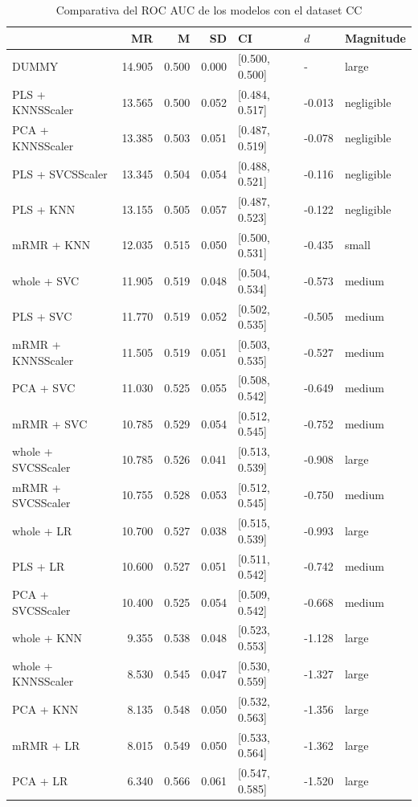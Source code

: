 \documentclass[a4paper,oneside,11pt,leqno]{article}
\begin{document}
	\begin{table}[h]
		\centering
		\begin{tabular}{lrrrlll}
			\toprule
			{} &     MR &     M &    SD &              CI &    $d$ &   Magnitude \\
			\midrule
			DUMMY              & 14.905 & 0.500 & 0.000 &  [0.500, 0.500] &      - &       large \\
			PLS + KNNSScaler   & 13.565 & 0.500 & 0.052 &  [0.484, 0.517] & -0.013 &  negligible \\
			PCA + KNNSScaler   & 13.385 & 0.503 & 0.051 &  [0.487, 0.519] & -0.078 &  negligible \\
			PLS + SVCSScaler   & 13.345 & 0.504 & 0.054 &  [0.488, 0.521] & -0.116 &  negligible \\
			PLS + KNN          & 13.155 & 0.505 & 0.057 &  [0.487, 0.523] & -0.122 &  negligible \\
			mRMR + KNN         & 12.035 & 0.515 & 0.050 &  [0.500, 0.531] & -0.435 &       small \\
			whole + SVC        & 11.905 & 0.519 & 0.048 &  [0.504, 0.534] & -0.573 &      medium \\
			PLS + SVC          & 11.770 & 0.519 & 0.052 &  [0.502, 0.535] & -0.505 &      medium \\
			mRMR + KNNSScaler  & 11.505 & 0.519 & 0.051 &  [0.503, 0.535] & -0.527 &      medium \\
			PCA + SVC          & 11.030 & 0.525 & 0.055 &  [0.508, 0.542] & -0.649 &      medium \\
			mRMR + SVC         & 10.785 & 0.529 & 0.054 &  [0.512, 0.545] & -0.752 &      medium \\
			whole + SVCSScaler & 10.785 & 0.526 & 0.041 &  [0.513, 0.539] & -0.908 &       large \\
			mRMR + SVCSScaler  & 10.755 & 0.528 & 0.053 &  [0.512, 0.545] & -0.750 &      medium \\
			whole + LR         & 10.700 & 0.527 & 0.038 &  [0.515, 0.539] & -0.993 &       large \\
			PLS + LR           & 10.600 & 0.527 & 0.051 &  [0.511, 0.542] & -0.742 &      medium \\
			PCA + SVCSScaler   & 10.400 & 0.525 & 0.054 &  [0.509, 0.542] & -0.668 &      medium \\
			whole + KNN        &  9.355 & 0.538 & 0.048 &  [0.523, 0.553] & -1.128 &       large \\
			whole + KNNSScaler &  8.530 & 0.545 & 0.047 &  [0.530, 0.559] & -1.327 &       large \\
			PCA + KNN          &  8.135 & 0.548 & 0.050 &  [0.532, 0.563] & -1.356 &       large \\
			mRMR + LR          &  8.015 & 0.549 & 0.050 &  [0.533, 0.564] & -1.362 &       large \\
			PCA + LR           &  6.340 & 0.566 & 0.061 &  [0.547, 0.585] & -1.520 &       large \\
			\bottomrule
		\end{tabular}
		\caption{Comparativa del ROC AUC de los modelos con el dataset CC}
		\label{tab:stat_results_cc}
	\end{table}
\end{document}

